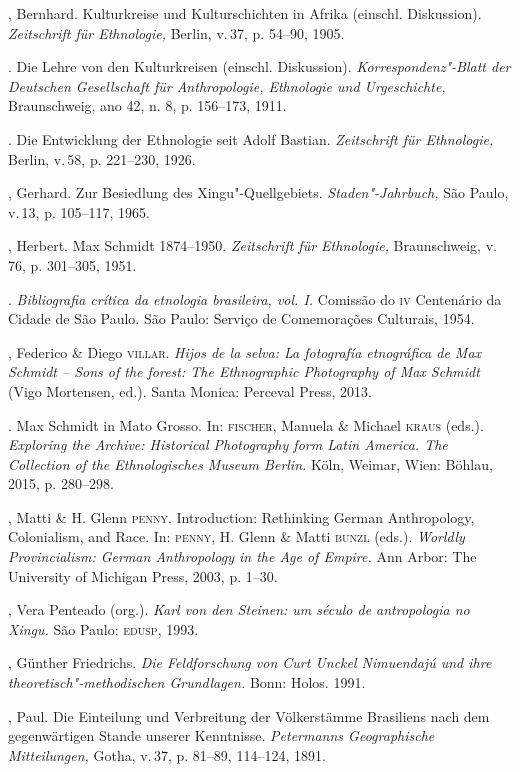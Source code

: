 \begin{bibliohedra}
, Bernhard. Kulturkreise und Kulturschichten in Afrika
(einschl. Diskussion). \textit{Zeitschrift für Ethnologie,} Berlin, v.\,37, p. 54--90, 1905.

\titidem. Die Lehre von den Kulturkreisen (einschl.
Diskussion). \textit{Korrespondenz"-Blatt der Deutschen Gesellschaft für
Anthropologie, Ethnologie und Urgeschichte,} Braunschweig, ano 42, n. 8,
p. 156--173, 1911.

\titidem. Die Entwicklung der Ethnologie seit Adolf Bastian.
\textit{Zeitschrift für Ethnologie,} Berlin, v.\,58, p. 221--230, 1926.

, Gerhard. Zur Besiedlung des Xingu"-Quellgebiets.
\textit{Staden"-Jahrbuch,} São Paulo, v.\,13, p. 105--117, 1965.

, Herbert. Max Schmidt 1874--1950. \textit{Zeitschrift für
Ethnologie,} Braunschweig, v.\,76, p. 301--305, 1951.

\titidem. \textit{Bibliografia crítica da etnologia
brasileira, vol. I.} Comissão do \textsc{iv} Centenário da Cidade de São Paulo.
São Paulo: Serviço de Comemorações Culturais, 1954.

, Federico \& Diego \textsc{villar}. \textit{Hijos de la selva: La
fotografía etnográfica de Max Schmidt -- Sons of the forest: The
Ethnographic Photography of Max Schmidt} (Vigo Mortensen, ed.). Santa
Monica: Perceval Press, 2013.

\titidem. Max Schmidt in Mato Grosso. In: \textsc{fischer}, Manuela
\& Michael \textsc{kraus} (eds.). \textit{Exploring the Archive: Historical
Photography form Latin America. The Collection of the Ethnologisches
Museum Berlin.} Köln, Weimar, Wien: Böhlau, 2015, p. 280--298.

, Matti \& H. Glenn \textsc{penny}. Introduction: Rethinking German
Anthropology, Colonialism, and Race. In: \textsc{penny}, H. Glenn \& Matti \textsc{bunzl}
(eds.). \textit{Worldly Provincialism: German Anthropology in the Age of
Empire.} Ann Arbor: The University of Michigan Press, 2003, p. 1--30.

, Vera Penteado (org.). \textit{Karl von den Steinen: um século de
antropologia no Xingu.} São Paulo: \textsc{edusp}, 1993.

, Günther Friedrichs. \textit{Die Feldforschung von Curt Unckel
Nimuendajú und ihre theoretisch"-methodischen Grundlagen.} Bonn: Holos.
1991.

, Paul. Die Einteilung und Verbreitung der Völkerstämme
Brasiliens nach dem gegenwärtigen Stande unserer Kenntnisse.
\textit{Petermanns Geographische Mitteilungen,} Gotha, v.\,37, p. 81--89,
114--124, 1891.


\end{bibliohedra}
